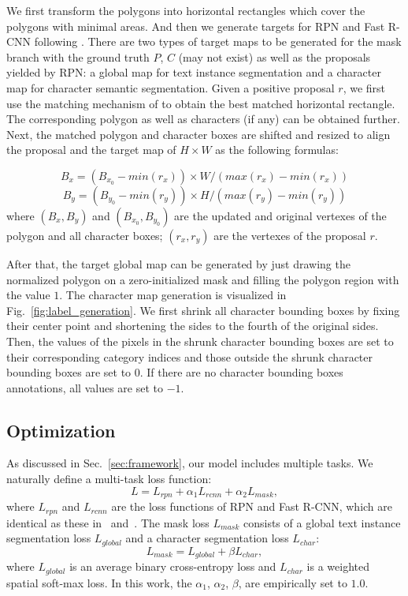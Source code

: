 \documentclass[runningheads]{llncs}
\begin{document}
We first transform the polygons into horizontal rectangles which cover the polygons with minimal areas. And then we generate targets for RPN and Fast R-CNN following \cite{fastrcnn,ren2015faster,lin2017feature}. There are two types of target maps to be generated for the mask branch with the ground truth $P$, $C$ (may not exist) as well as the proposals yielded by RPN: a global map for text instance segmentation and a character map for character semantic segmentation. 
Given a positive  proposal $r$, we first use the matching mechanism of \cite{fastrcnn,ren2015faster,lin2017feature} to obtain the best matched horizontal rectangle. The corresponding polygon as well as characters (if any) can be obtained further. Next, the matched polygon and character boxes are shifted and resized to align the proposal and the target map of $H\times W$ as  the following formulas:

\begin{equation}
B_{x}=(B_{x_0}-min(r_{x})) \times W / (max(r_{x})-min(r_{x}))
\end{equation}
\begin{equation}
B_{y}=(B_{y_0}-min(r_{y})) \times H / (max(r_{y})-min(r_{y}))
\end{equation}
where $(B_{x},B_{y})$ and $(B_{x_0},B_{y_0})$ are the updated and original vertexes of the polygon and all character boxes; $(r_{x}, r_{y})$ are the vertexes of the proposal $r$.

After that, the target global map can be generated by just drawing the normalized polygon on a zero-initialized mask and filling the polygon region with the value $1$. 
The character map generation is visualized in Fig.~\ref{fig:label_generation}. We first shrink all character bounding boxes by fixing their center point and shortening the sides to the fourth of the original sides. Then, the values of the pixels in the shrunk character bounding boxes are set to their corresponding category indices and those outside the shrunk character bounding boxes are set to $0$. If there are no character bounding boxes annotations, all values are set to $-1$.

\subsection{Optimization}
As discussed in Sec.~\ref{sec:framework}, our model includes multiple tasks. We naturally define a multi-task loss function:
\begin{equation}
L = L_{rpn} + \alpha_1 L_{rcnn} + \alpha_2 L_{mask},
\end{equation}
where $L_{rpn}$ and $L_{rcnn}$ are the loss functions of RPN and Fast R-CNN, which are identical as these in~\cite{ren2015faster} and~\cite{fastrcnn}. 
The mask loss $L_{mask}$ consists of a global text instance segmentation loss $L_{global}$ and a character segmentation loss $L_{char}$:
\begin{equation}
L_{mask} = L_{global} + \beta L_{char},
\end{equation}
where $L_{global}$ is an average binary cross-entropy loss and $L_{char}$ is a weighted spatial soft-max loss. In this work, the $\alpha_1$, $\alpha_2$, $\beta$, are empirically set to $1.0$.
\end{document}
